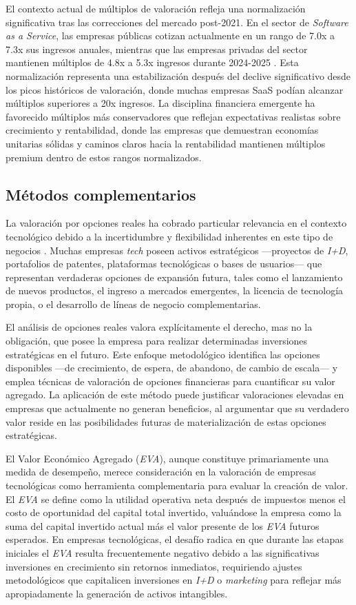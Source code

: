 El contexto actual de múltiplos de valoración refleja una normalización significativa tras las correcciones del mercado post-2021. En el sector de \emph{Software as a Service}, las empresas públicas cotizan actualmente en un rango de 7.0x a 7.3x sus ingresos anuales, mientras que las empresas privadas del sector mantienen múltiplos de 4.8x a 5.3x ingresos durante 2024-2025 \citep{saasmetrics2024}. Esta normalización representa una estabilización después del declive significativo desde los picos históricos de valoración, donde muchas empresas SaaS podían alcanzar múltiplos superiores a 20x ingresos. La disciplina financiera emergente ha favorecido múltiplos más conservadores que reflejan expectativas realistas sobre crecimiento y rentabilidad, donde las empresas que demuestran economías unitarias sólidas y caminos claros hacia la rentabilidad mantienen múltiplos premium dentro de estos rangos normalizados.

\subsection{Métodos complementarios}

La valoración por opciones reales ha cobrado particular relevancia en el contexto tecnológico debido a la incertidumbre y flexibilidad inherentes en este tipo de negocios \citep{santos2022}. Muchas empresas \emph{tech} poseen activos estratégicos ---proyectos de \emph{I+D}, portafolios de patentes, plataformas tecnológicas o bases de usuarios--- que representan verdaderas opciones de expansión futura, tales como el lanzamiento de nuevos productos, el ingreso a mercados emergentes, la licencia de tecnología propia, o el desarrollo de líneas de negocio complementarias.

El análisis de opciones reales valora explícitamente el derecho, mas no la obligación, que posee la empresa para realizar determinadas inversiones estratégicas en el futuro. Este enfoque metodológico identifica las opciones disponibles ---de crecimiento, de espera, de abandono, de cambio de escala--- y emplea técnicas de valoración de opciones financieras para cuantificar su valor agregado. La aplicación de este método puede justificar valoraciones elevadas en empresas que actualmente no generan beneficios, al argumentar que su verdadero valor reside en las posibilidades futuras de materialización de estas opciones estratégicas.

El Valor Económico Agregado (\emph{EVA}), aunque constituye primariamente una medida de desempeño, merece consideración en la valoración de empresas tecnológicas como herramienta complementaria para evaluar la creación de valor. El \emph{EVA} se define como la utilidad operativa neta después de impuestos menos el costo de oportunidad del capital total invertido, valuándose la empresa como la suma del capital invertido actual más el valor presente de los \emph{EVA} futuros esperados. En empresas tecnológicas, el desafío radica en que durante las etapas iniciales el \emph{EVA} resulta frecuentemente negativo debido a las significativas inversiones en crecimiento sin retornos inmediatos, requiriendo ajustes metodológicos que capitalicen inversiones en \emph{I+D} o \emph{marketing} para reflejar más apropiadamente la generación de activos intangibles.


